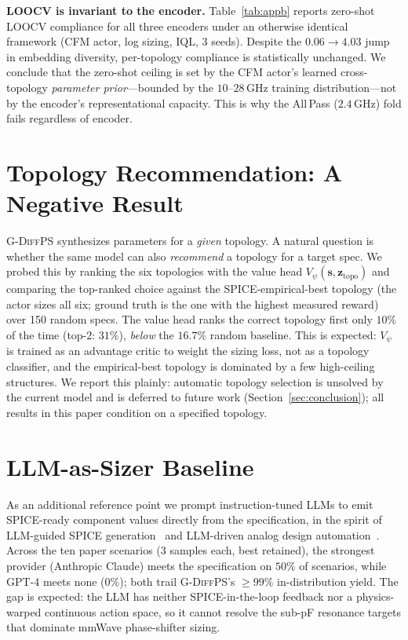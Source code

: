 \documentclass[sigconf,anonymous,review]{acmart}
\newcommand{\gdiffps}{\textsc{G-DiffPS}}
\begin{document}
\textbf{LOOCV is invariant to the encoder.}  Table~\ref{tab:appb} reports
zero-shot LOOCV compliance for all three encoders under an otherwise identical
framework (CFM actor, log sizing, IQL, 3 seeds).  Despite the $0.06\to4.03$
jump in embedding diversity, per-topology compliance is statistically
unchanged.  We conclude that the zero-shot ceiling is set by the CFM actor's
learned cross-topology \emph{parameter prior}---bounded by the $10$--$28$\,GHz
training distribution---not by the encoder's representational capacity.  This
is why the All\,Pass ($2.4$\,GHz) fold fails regardless of encoder.

\begin{table}[h]
  \caption{LOOCV compliance (\%) is invariant across encoders; embedding
           $L_2$ diversity is not. Same framework, only the topology encoder
           differs. Auto-generated from \texttt{exp3\_loocv\_gin/}.}
  \label{tab:appb}
  \centering\small
  
\end{table}

\section{Topology Recommendation: A Negative Result}
\label{app:toposelect}

\gdiffps{} synthesizes parameters for a \emph{given} topology.  A natural
question is whether the same model can also \emph{recommend} a topology for a
target spec.  We probed this by ranking the six topologies with the value head
$V_\psi(\mathbf{s},\mathbf{z}_\text{topo})$ and comparing the top-ranked choice
against the SPICE-empirical-best topology (the actor sizes all six; ground
truth is the one with the highest measured reward) over 150 random specs.
The value head ranks the correct topology first only $10\%$ of the time
(top-2: $31\%$), \emph{below} the $16.7\%$ random baseline.  This is expected:
$V_\psi$ is trained as an advantage critic to weight the sizing loss, not as a
topology classifier, and the empirical-best topology is dominated by a few
high-ceiling structures.  We report this plainly: automatic topology selection
is unsolved by the current model and is deferred to future work
(Section~\ref{sec:conclusion}); all results in this paper condition on a
specified topology.

\section{LLM-as-Sizer Baseline}
\label{app:llm}

As an additional reference point we prompt instruction-tuned LLMs to emit
SPICE-ready component values directly from the specification, in the spirit of
LLM-guided SPICE generation~\cite{spicepilot2024} and LLM-driven analog design
automation~\cite{limca2025}.  Across the ten paper scenarios (3 samples each,
best retained), the strongest provider (Anthropic Claude) meets the
specification on $50\%$ of scenarios, while GPT-4 meets none ($0\%$); both
trail \gdiffps{}'s $\geq 99\%$ in-distribution yield.  The gap is expected:
the LLM has neither SPICE-in-the-loop feedback nor a physics-warped continuous
action space, so it cannot resolve the sub-pF resonance targets that dominate
mmWave phase-shifter sizing.
\end{document}
